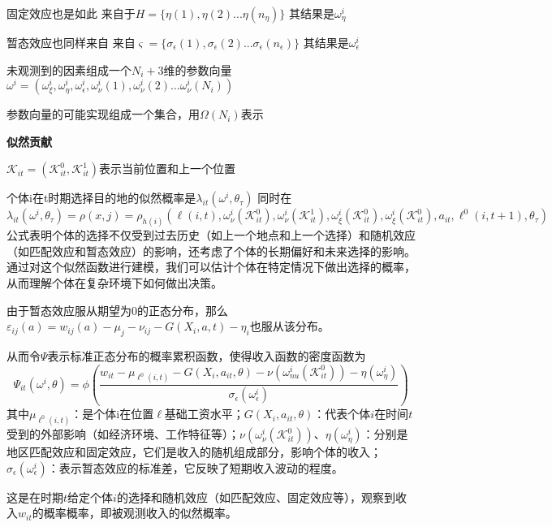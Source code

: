 \documentclass[a4paper,10pt]{article}
\begin{document}
固定效应也是如此
来自于$H=\{\eta(1),\eta(2)...\eta(n_\eta)\}$
其结果是$\omega^{i}_{\eta}$

暂态效应也同样来自
来自$\varsigma=\{\sigma_{\epsilon}(1),\sigma_{\epsilon}(2)...\sigma_{\epsilon}(n_{\epsilon})\}$
其结果是$\omega^{i}_{\epsilon}$

未观测到的因素组成一个$N_{i}+3$维的参数向量$\omega^{i}=(\omega^{i}_{\xi},\omega^{i}_{\eta},\omega^{i}_{\epsilon},\omega^{i}_{\nu}(1),\omega^{i}_{\nu}(2)...\omega^{i}_{\nu}(N_{i}))$

参数向量的可能实现组成一个集合，用$\Omega(N_{i})$表示

\textbf{似然贡献}

$\mathcal{K}_{it}=(\mathcal{K}_{it}^{0},\mathcal{K}_{it}^{1})$表示当前位置和上一个位置

个体i在t时期选择目的地的似然概率是$\lambda_{it}(\omega^{i},\theta_{\tau})$
同时在
\begin{equation}
  \lambda_{it}(\omega^{i},\theta_{\tau})=\rho(x,j)=\rho_{h(i)}(\ell(i,t),\omega_{\nu}^{i}(\mathcal{K}_{it}^{0}),\omega_{\nu}^{i}(\mathcal{K}_{it}^{1}),\omega_{\xi}^{i}(\mathcal{K}_{it}^{0}),\omega_{\xi}^{i}(\mathcal{K}_{it}^{0}),a_{it},\ell^{0}(i,t+1),\theta_{\tau})
\end{equation}
公式表明个体的选择不仅受到过去历史（如上一个地点和上一个选择）和随机效应（如匹配效应和暂态效应）的影响，还考虑了个体的长期偏好和未来选择的影响。
通过对这个似然函数进行建模，我们可以估计个体在特定情况下做出选择的概率，从而理解个体在复杂环境下如何做出决策。


由于暂态效应服从期望为0的正态分布，那么$\varepsilon_{ij}(a)=w_{ij}(a)-\mu_j-\nu_{ij}-G(X_i,a,t)-\eta_i$也服从该分布。

从而令$\Psi$表示标准正态分布的概率累积函数，使得收入函数的密度函数为
\begin{equation}
  \Psi_{it}(\omega^{i},\theta)=\phi(\frac{w_{it} - \mu_{\ell^{0}(i,t)}-G(X_{i},a_{it},\theta)-\nu(\omega_{nu}^{i}(\mathcal{K}_{it}^{0}))-\eta(\omega_{\eta}^{i})  }{\sigma_{\epsilon}(\omega_{\epsilon}^{i})})
\end{equation}
其中$\mu_{\ell^{0}(i,t)}$：是个体i在位置$\ell$基础工资水平；$G(X_i, a_{it}, \theta)$：代表个体$i$在时间$t$受到的外部影响（如经济环境、工作特征等）；$\nu(\omega_{\nu}^i(\mathcal{K}_{it}^0))$、$\eta(\omega_{\eta}^i)$：分别是地区匹配效应和固定效应，它们是收入的随机组成部分，影响个体的收入；$\sigma_{\epsilon}(\omega_{\epsilon}^i)$：表示暂态效应的标准差，它反映了短期收入波动的程度。

这是在时期$t$给定个体$i$的选择和随机效应（如匹配效应、固定效应等），观察到收入$w_{it}$的概率概率，即被观测收入的似然概率。
\end{document}

